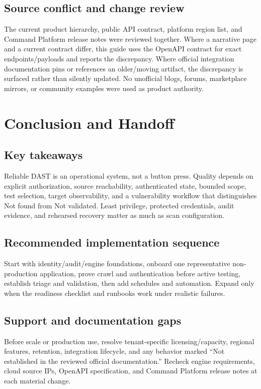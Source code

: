 \documentclass[11pt,letterpaper,oneside]{scrreprt}
\begin{document}
\section{Source conflict and change review}
The current product hierarchy, public API contract, platform region list, and Command Platform release notes were reviewed together. Where a narrative page and a current contract differ, this guide uses the OpenAPI contract for exact endpoints/payloads and reports the discrepancy. Where official integration documentation pins or references an older/moving artifact, the discrepancy is surfaced rather than silently updated. No unofficial blogs, forums, marketplace mirrors, or community examples were used as product authority.

\chapter*{Conclusion and Handoff}
\section*{Key takeaways}
Reliable DAST is an operational system, not a button press. Quality depends on explicit authorization, source reachability, authenticated state, bounded scope, test selection, target observability, and a vulnerability workflow that distinguishes Not found from Not validated. Least privilege, protected credentials, audit evidence, and rehearsed recovery matter as much as scan configuration.

\section*{Recommended implementation sequence}
Start with identity/audit/engine foundations, onboard one representative non-production application, prove crawl and authentication before active testing, establish triage and validation, then add schedules and automation. Expand only when the readiness checklist and runbooks work under realistic failures.

\section*{Support and documentation gaps}
Before scale or production use, resolve tenant-specific licensing/capacity, regional features, retention, integration lifecycle, and any behavior marked ``Not established in the reviewed official documentation.'' Recheck engine requirements, cloud source IPs, OpenAPI specification, and Command Platform release notes at each material change.
\end{document}
